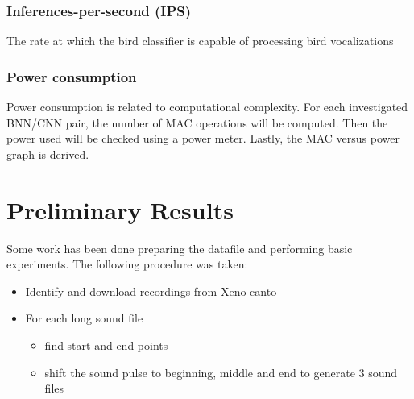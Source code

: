 \subsubsection{Inferences-per-second (IPS)}

The rate at which the bird classifier is capable of processing bird vocalizations

\subsubsection{Power consumption}

Power consumption is related to computational complexity.
For each investigated BNN/CNN pair, the number of MAC operations will be computed.
Then the power used will be checked using a power meter.
Lastly, the MAC versus power graph is derived.


\section{Preliminary Results}

Some work has been done preparing the datafile and performing basic experiments. The following procedure was taken:

	\begin{itemize}
    \itemsep0em
     \item Identify and download recordings from Xeno-canto
        \item For each long sound file
        \begin{itemize}
        \itemsep0em
        \item find start and end points
			\item shift the sound pulse to beginning, middle and end
				to generate 3 sound files
        \end{itemize}
	\end{itemize}

